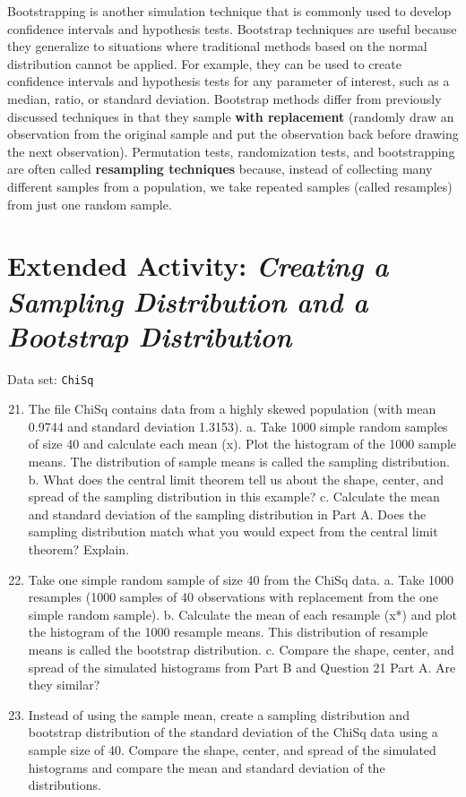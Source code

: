 \documentclass[
]{report}
\begin{document}
Bootstrapping is another simulation technique that is commonly used to develop confidence intervals and
hypothesis tests. Bootstrap techniques are useful because they generalize to situations where traditional methods
based on the normal distribution cannot be applied. For example, they can be used to create confidence intervals
and hypothesis tests for any parameter of interest, such as a median, ratio, or standard deviation. Bootstrap
methods differ from previously discussed techniques in that they sample \textbf{with replacement} (randomly draw
an observation from the original sample and put the observation back before drawing the next observation).
\textbar{} Permutation tests, randomization tests, and bootstrapping are often called \textbf{resampling techniques}
because, instead of collecting many different samples from a population, we take repeated samples (called
resamples) from just one random sample.

\section*{\texorpdfstring{Extended Activity: \emph{Creating a Sampling Distribution and a Bootstrap Distribution}}{Extended Activity: Creating a Sampling Distribution and a Bootstrap Distribution}}\label{extended-activity-creating-a-sampling-distribution-and-a-bootstrap-distribution}

Data set: \texttt{ChiSq}

\begin{enumerate}
  \setcounter{enumi}{20} 
\item The file ChiSq contains data from a highly skewed population (with mean 0.9744 and standard
deviation 1.3153).
a. Take 1000 simple random samples of size 40 and calculate each mean (x). Plot the histogram of the
1000 sample means. The distribution of sample means is called the sampling distribution.
b. What does the central limit theorem tell us about the shape, center, and spread of the sampling distribution
in this example?
c. Calculate the mean and standard deviation of the sampling distribution in Part A. Does the sampling
distribution match what you would expect from the central limit theorem? Explain.
\item Take one simple random sample of size 40 from the ChiSq data.
a. Take 1000 resamples (1000 samples of 40 observations with replacement from the one simple
random sample).
b. Calculate the mean of each resample (x*) and plot the histogram of the 1000 resample means. This
distribution of resample means is called the bootstrap distribution.
c. Compare the shape, center, and spread of the simulated histograms from Part B and Question
21 Part A. Are they similar?
\item Instead of using the sample mean, create a sampling distribution and bootstrap distribution of the standard
deviation of the ChiSq data using a sample size of 40. Compare the shape, center, and spread of
the simulated histograms and compare the mean and standard deviation of the distributions.
\end{enumerate}
\end{document}

